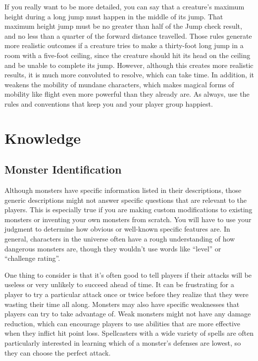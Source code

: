        If you really want to be more detailed, you can say that a creature's maximum height during a long jump must happen in the middle of its jump.
        That maximum height jump must be no greater than half of the Jump check result, and no less than a quarter of the forward distance travelled.
        Those rules generate more realistic outcomes if a creature tries to make a thirty-foot long jump in a room with a five-foot ceiling, since the creature should hit its head on the ceiling and be unable to complete its jump.
        However, although this creates more realistic results, it is much more convoluted to resolve, which can take time.
        In addition, it weakens the mobility of mundane characters, which makes magical forms of mobility like flight even more powerful than they already are.
        As always, use the rules and conventions that keep you and your player group happiest.

\section{Knowledge}\label{Knowledge}
    
    \subsection{Monster Identification}
        Although monsters have specific information listed in their descriptions, those generic descriptions might not answer specific questions that are relevant to the players.
        This is especially true if you are making custom modifications to existing monsters or inventing your own monsters from scratch.
        You will have to use your judgment to determine how obvious or well-known specific features are.
        In general, characters in the universe often have a rough understanding of how dangerous monsters are, though they wouldn't use words like ``level'' or ``challenge rating''.

        One thing to consider is that it's often good to tell players if their attacks will be useless or very unlikely to succeed ahead of time.
        It can be frustrating for a player to try a particular attack once or twice before they realize that they were wasting their time all along.
        Monsters may also have specific weaknesses that players can try to take advantage of.
        Weak monsters might not have any damage reduction, which can encourage players to use abilities that are more effective when they inflict hit point loss.
        Spellcasters with a wide variety of spells are often particularly interested in learning which of a monster's defenses are lowest, so they can choose the perfect attack.

